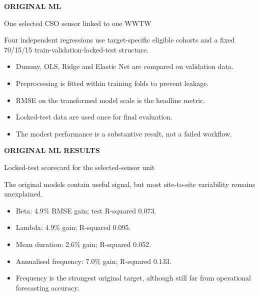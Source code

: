 \documentclass[10pt]{article}
\begin{document}
\vfill{}
\clearpage
{\color{teal}\small\bfseries ORIGINAL ML}\par
{}\par
\small One selected CSO sensor linked to one WWTW\par\vspace{5mm}
Four independent regressions use target-specific eligible cohorts and a fixed 70/15/15 train-validation-locked-test structure.
\begin{itemize}[leftmargin=5mm]
\item Dummy, OLS, Ridge and Elastic Net are compared on validation data.
\item Preprocessing is fitted within training folds to prevent leakage.
\item RMSE on the transformed model scale is the headline metric.
\item Locked-test data are used once for final evaluation.
\item The modest performance is a substantive result, not a failed workflow.
\end{itemize}
\vfill{}
\clearpage
{\color{teal}\small\bfseries ORIGINAL ML RESULTS}\par
{}\par
\small Locked-test scorecard for the selected-sensor unit\par\vspace{5mm}
The original models contain useful signal, but most site-to-site variability remains unexplained.
\begin{itemize}[leftmargin=5mm]
\item Beta: 4.9\% RMSE gain; test R-squared 0.073.
\item Lambda: 4.9\% gain; R-squared 0.095.
\item Mean duration: 2.6\% gain; R-squared 0.052.
\item Annualised frequency: 7.0\% gain; R-squared 0.133.
\item Frequency is the strongest original target, although still far from operational forecasting accuracy.
\end{itemize}
\end{document}
